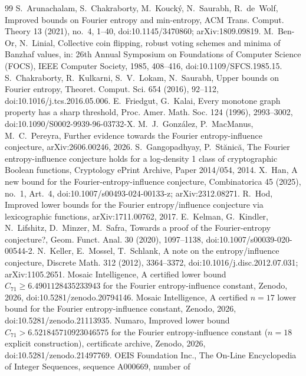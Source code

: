 \documentclass[11pt]{amsart}
\theoremstyle{remark}
\begin{document}
\begin{thebibliography}{99}
 S.~Arunachalam, S.~Chakraborty, M.~Kouck\'y, N.~Saurabh, R.~de~Wolf, Improved bounds on Fourier
entropy and min-entropy, ACM Trans. Comput. Theory 13 (2021), no.~4, 1--40, doi:10.1145/3470860; arXiv:1809.09819.
 M.~Ben-Or, N.~Linial, Collective coin flipping, robust voting schemes and minima of Banzhaf values, in:
26th Annual Symposium on Foundations of Computer Science (FOCS), IEEE Computer Society, 1985, 408--416, doi:10.1109/SFCS.1985.15.
 S.~Chakraborty, R.~Kulkarni, S.~V.~Lokam, N.~Saurabh, Upper bounds on Fourier entropy, Theoret.
Comput. Sci. 654 (2016), 92--112, doi:10.1016/j.tcs.2016.05.006.
 E.~Friedgut, G.~Kalai, Every monotone graph property has a sharp threshold, Proc. Amer. Math. Soc.
124 (1996), 2993--3002, doi:10.1090/S0002-9939-96-03732-X.
 M.~J.~Gonz\'alez, P.~MacManus, M.~C.~Pereyra, Further evidence towards the Fourier
entropy-influence conjecture, arXiv:2606.00246, 2026.
 S.~Gangopadhyay, P.~St\u{a}nic\u{a}, The Fourier entropy-influence conjecture holds for a log-density 1
class of cryptographic Boolean functions, Cryptology ePrint Archive, Paper 2014/054, 2014.
 X.~Han, A new bound for the Fourier-entropy-influence conjecture, Combinatorica 45 (2025), no.~1,
Art.~4, doi:10.1007/s00493-024-00133-z; arXiv:2312.08271.
 R.~Hod, Improved lower bounds for the Fourier entropy/influence conjecture via lexicographic functions,
arXiv:1711.00762, 2017.
 E.~Kelman, G.~Kindler, N.~Lifshitz, D.~Minzer, M.~Safra, Towards a proof of the Fourier-entropy
conjecture?, Geom. Funct. Anal. 30 (2020), 1097--1138, doi:10.1007/s00039-020-00544-2.
 N.~Keller, E.~Mossel, T.~Schlank, A note on the entropy/influence conjecture, Discrete Math. 312
(2012), 3364--3372, doi:10.1016/j.disc.2012.07.031; arXiv:1105.2651.
 Mosaic Intelligence, A certified lower bound $C_{71}\ge 6.4901128435233943$ for the Fourier entropy-influence constant, Zenodo, 2026, doi:10.5281/zenodo.20794146.
 Mosaic Intelligence, A certified $n=17$ lower bound for the Fourier entropy-influence constant, Zenodo, 2026, doi:10.5281/zenodo.21113935.
 Numaro, Improved lower bound $C_{71}>6.521845710923046575$ for the Fourier entropy-influence constant ($n=18$ explicit construction), certificate archive, Zenodo, 2026, doi:10.5281/zenodo.21497769.
 OEIS Foundation Inc., The On-Line Encyclopedia of Integer Sequences, sequence A000669, number of

\end{thebibliography}
\end{document}
